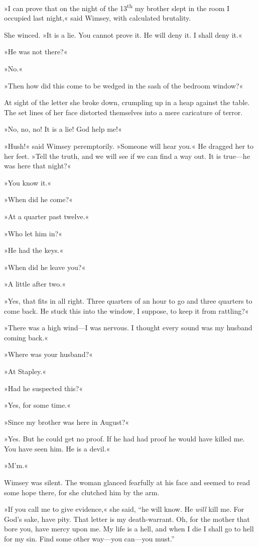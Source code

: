 »I can prove that on the night of the 13\textsuperscript{th} my brother slept in the room I occupied last night,« said Wimsey, with calculated brutality.

She winced. »It is a lie. You cannot prove it. He will deny it. I shall deny it.«

»He was not there?«

»No.«

»Then how did this come to be wedged in the sash of the bedroom window?«

At sight of the letter she broke down, crumpling up in a heap against the table. The set lines of her face distorted themselves into a mere caricature of terror.

»No, no, no! It is a lie! God help me!«

»Hush!« said Wimsey peremptorily. »Someone will hear you.« He dragged her to her feet. »Tell the truth, and we will see if we can find a way out. It is true—he was here that night?«

»You know it.«

»When did he come?«

»At a quarter past twelve.«

»Who let him in?«

»He had the keys.«

»When did he leave you?«

»A little after two.«

»Yes, that fits in all right. Three quarters of an hour to go and three quarters to come back. He stuck this into the window, I suppose, to keep it from rattling?«

»There was a high wind—I was nervous. I thought every sound was my husband coming back.«

»Where was your husband?«

»At Stapley.«

»Had he suspected this?«

»Yes, for some time.«

»Since my brother was here in August?«

»Yes. But he could get no proof. If he had had proof he would have killed me. You have seen him. He is a devil.«

»M'm.«

Wimsey was silent. The woman glanced fearfully at his face and seemed to read some hope there, for she clutched him by the arm.

»If you call me to give evidence,« she said, \enquote{he will know. He \textit{will} kill me. For God's sake, have pity. That letter is my death-warrant.  Oh, for the mother that bore you, have mercy upon me. My life is a hell, and when I die I shall go to hell for my sin. Find some other way—you can—you must.}

